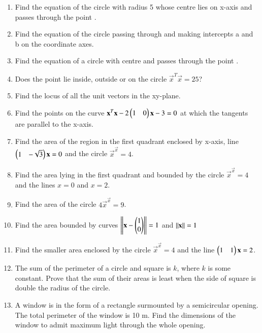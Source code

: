 \begin{enumerate}[label=\arabic*.,ref=\thesubsection.\theenumi]
\item Find the equation of the circle with radius 5 whose centre lies on x-axis and passes through the point .
\item Find the equation of the circle passing through  and making intercepts a and b on the coordinate axes.
\item Find the equation of a circle with centre  and passes through the point . 
\item  Does the point  lie inside, outside or on the circle $\vec{x}^T\vec{x} = 25$?
\item Find the locus of all the unit vectors in the xy-plane.
%
\item Find the points on the curve $\mathbf{x}^T\mathbf{x}-2\begin{pmatrix}1 & 0\end{pmatrix}\mathbf{x} -3 =0$  at which the tangents are parallel to the x-axis.
%
\item  Find the area of the region in the first quadrant enclosed by x-axis, line $\begin{pmatrix}1 & -\sqrt{3}\end{pmatrix}\mathbf{x} =0$ and the circle $\vec{x}^\vec{x}=4$.
%
\item Find the area lying in the first quadrant and bounded by the circle $\vec{x}^\vec{x}=4$ and the lines $x = 0$ and $x = 2$.
%
\item Find the area of the circle $4\vec{x}^\vec{x}=9$.
\item  Find the area bounded by curves $\left\lVert\mathbf{x}-\begin{pmatrix}1\\0\end{pmatrix}\right\rVert = 1$ and $\left\lVert\mathbf{x}\right\rVert=1$
\item Find the smaller area enclosed by the circle $\vec{x}^\vec{x}=4$ and the line $\begin{pmatrix}1 & 1\end{pmatrix}\mathbf{x} = 2$.
\item The sum of the perimeter of a circle and square is $k$, where $k$ is some constant. Prove that the sum of their areas is least when the side of square is double the radius of the circle.
\item A window is in the form of a rectangle surmounted by a semicircular opening. The total perimeter of the window is 10 m. Find the dimensions of the window to admit maximum light through the whole opening.
\end{enumerate}
